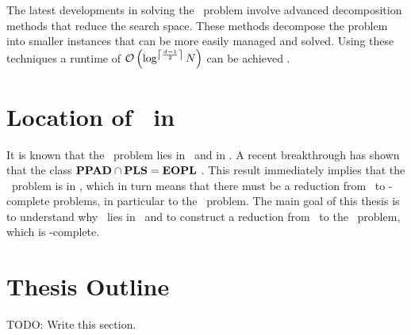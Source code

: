 The latest developments in solving the \Tarski\ problem involve advanced decomposition methods that reduce the search space. These methods decompose the problem into smaller instances that can be more easily managed and solved. Using these techniques a runtime of $\mathcal{O}\left(\log^{\left\lceil\frac{d-1}{2}\right\rceil}{N}\right)$ can be achieved .

\section{Location of \Tarski\ in \TFNP}

It is known that the \Tarski\ problem lies in \PPAD\ and in \PLS. A recent breakthrough has shown that the class $\textbf{PPAD} \cap \textbf{PLS} = \textbf{EOPL}$ . This result immediately implies that the \Tarski\ problem is in \EOPL, which in turn means that there must be a reduction from \Tarski\ to \EOPL-complete problems, in particular to the \EndOfPotentialLine\ problem. The main goal of this thesis is to understand why \Tarski\ lies in \EOPL\ and to construct a reduction from \Tarski\ to the \EndOfPotentialLine\ problem, which is \EOPL-complete.

\section{Thesis Outline}

TODO: Write this section.